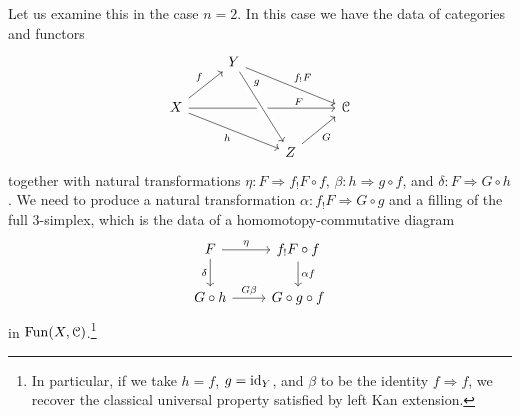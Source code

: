 \documentclass[main.tex]{subfiles}
\begin{document}

Let us examine this in the case $n = 2$. In this case we have the data of categories and functors
\begin{equation*}
  \begin{tikzcd}
    & Y
    \arrow[drr, "f_{!}F"]
    \\
    X
    \arrow[drr, swap, "h"]
    \arrow[ur, "f"]
    \arrow[rrr, near end, "F"]
    &&& \category{C}
    \\
    && Z
    \arrow[ur, swap, "G"]
    \arrow[from=uul, crossing over, near start, "g"]
  \end{tikzcd}
\end{equation*}
together with natural transformations $\eta\colon F \Rightarrow f_{!}F \circ f$, $\beta\colon h \Rightarrow g \circ f$, and $\delta\colon F \Rightarrow G \circ h$. We need to produce a natural transformation $\alpha\colon f_{!}F \Rightarrow G \circ g$ and a filling of the full 3-simplex, which is the data of a homomotopy-commutative diagram
\begin{equation*}
  \begin{tikzcd}
    F
    \arrow[r, "\eta"]
    \arrow[d, swap, "\delta"]
    & f_{!}F \circ f
    \arrow[d, "\alpha f"]
    \\
    G \circ h
    \arrow[r, "G \beta"]
    & G \circ g \circ f
  \end{tikzcd}
\end{equation*}
in $\mathrm{Fun}(X, \mathcal{C})$.\footnote{In particular, if we take $h = f$, $g = \mathrm{id}_{Y}$, and $\beta$ to be the identity $f \Rightarrow f$, we recover the classical universal property satisfied by left Kan extension.}
\end{document}

